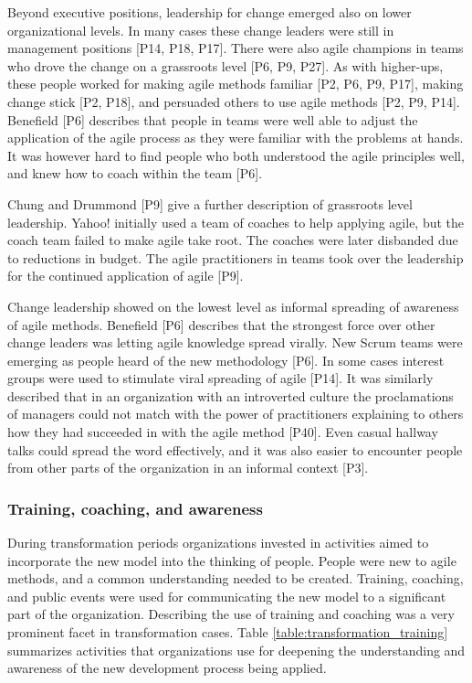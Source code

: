 \documentclass[preprint,authoryear,12pt]{elsarticle}
\begin{document}

Beyond executive positions, leadership for change emerged also on lower
organizational levels. In many cases these change leaders were still in
management positions [P14, P18, P17]. There were also agile champions in teams
who drove the change on a grassroots level [P6, P9, P27].
As with higher-ups, these people worked for making agile methods familiar [P2,
P6, P9, P17], making change stick [P2, P18], and persuaded others to use agile
methods [P2, P9, P14].
Benefield [P6] describes that people in teams were well able to adjust the
application of the agile process as they were familiar with the problems at
hands. It was however hard to find people who both understood the agile
principles well, and knew how to coach within the team [P6].

Chung and Drummond [P9] give a further description of grassroots level
leadership. Yahoo! initially used a team of coaches to help applying agile, but
the coach team failed to make agile take root. The coaches were later disbanded
due to reductions in budget. The agile practitioners in teams took over the
leadership for the continued application of agile [P9].


Change leadership showed on the lowest level as informal spreading of awareness
of agile methods.
Benefield [P6] describes that the strongest force over other change leaders was
letting agile knowledge spread virally. New Scrum teams were emerging as people
heard of the new methodology [P6]. In some cases interest groups were used to
stimulate viral spreading of agile [P14].
It was similarly described that in an organization with an introverted culture
the proclamations of managers could not match with the power of practitioners
explaining to others how they had succeeded in with the agile method [P40].
Even casual hallway talks could spread the word effectively, and it was also
easier to encounter people from other parts of the organization in an informal
context [P3].


\subsubsection{Training, coaching, and awareness}

During transformation periods organizations invested in activities aimed to
incorporate the new model into the thinking of people. People were new to agile
methods, and a common understanding needed to be created. Training, coaching,
and public events were used for communicating the new model to a significant
part of the organization. Describing the use of training and coaching was a very
prominent facet in transformation cases.
Table \ref{table:transformation_training} summarizes activities that
organizations use for deepening the understanding and awareness of the new
development process being applied.
\end{document}
